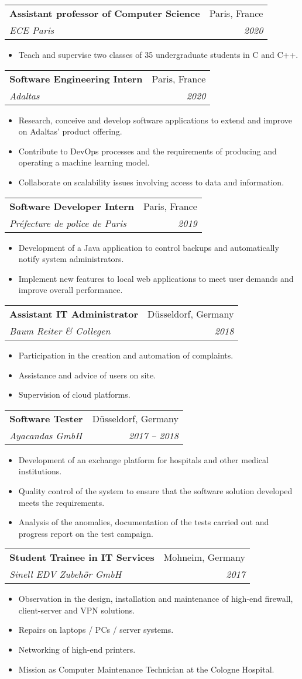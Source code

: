 \documentclass[a4paper,11pt]{article}
\makeatletter
\newcommand{\resumeItem}[2]{
  \item\small{
    \textbf{#1}{ #2 \vspace{-2pt}}
  }
}
\newcommand{\resumeSubheading}[4]{
  \vspace{-1pt}\item
    \begin{tabular*}{0.97\textwidth}{l@{\extracolsep{\fill}}r}
      \textbf{#1} & #2 \\
      \textit{\small#3} & \textit{\small #4} \\
    \end{tabular*}\vspace{-5pt}
}
\newcommand{\resumeItemListStart}{\begin{itemize}}
\newcommand{\resumeItemListEnd}{\end{itemize}\vspace{-5pt}}
\makeatother
\begin{document}
    \resumeSubheading
      {Assistant professor of Computer Science}{Paris, France}
      {ECE Paris}{2020}
      \resumeItemListStart
        \resumeItem{}
          {Teach and supervise two classes of 35 undergraduate students in C and C++.}
    \resumeItemListEnd

    \resumeSubheading
      {Software Engineering Intern}{Paris, France}
      {Adaltas}{2020}
      \resumeItemListStart
        \resumeItem{}
          {Research, conceive and develop software applications to extend and improve on Adaltas' product offering.}
        \resumeItem{}
          {Contribute to DevOps processes and the requirements of producing and operating a machine learning model.}
        \resumeItem{}
          {Collaborate on scalability issues involving access to data and information.}
      \resumeItemListEnd
  
    \resumeSubheading
      {Software Developer Intern}{Paris, France}
      {Préfecture de police de Paris}{2019}
      \resumeItemListStart
        \resumeItem{}
          {Development of a Java application to control backups and automatically notify system administrators.}
        \resumeItem{}
          {Implement new features to local web applications to meet user demands and improve overall performance.}
      \resumeItemListEnd

    \resumeSubheading
      {Assistant IT Administrator}{Düsseldorf, Germany}
      {Baum Reiter \& Collegen}{2018}
      \resumeItemListStart
        \resumeItem{}
          {Participation in the creation and automation of complaints.}
        \resumeItem{}
          {Assistance and advice of users on site.}
        \resumeItem{}
          {Supervision of cloud platforms.}
      \resumeItemListEnd

    \resumeSubheading
      {Software Tester}{Düsseldorf, Germany}
      {Ayacandas GmbH}{2017 -- 2018}
      \resumeItemListStart
        \resumeItem{}
          {Development of an exchange platform for hospitals and other medical institutions.}
        \resumeItem{}
          {Quality control of the system to ensure that the software solution developed meets the requirements.}
        \resumeItem{}
          {Analysis of the anomalies, documentation of the tests carried out and progress report on the test campaign.}
      \resumeItemListEnd

      \resumeSubheading
      {Student Trainee in IT Services}{Mohneim, Germany}
      {Sinell EDV Zubehör GmbH}{2017}
      \resumeItemListStart
        \resumeItem{}
          {Observation in the design, installation and maintenance of high-end firewall, client-server and VPN solutions.}
        \resumeItem{}
          {Repairs on laptops / PCs / server systems.}
        \resumeItem{}
          {Networking of high-end printers.}
        \resumeItem{}
          {Mission as Computer Maintenance Technician at the Cologne Hospital.}
      \resumeItemListEnd
      
\end{document}
